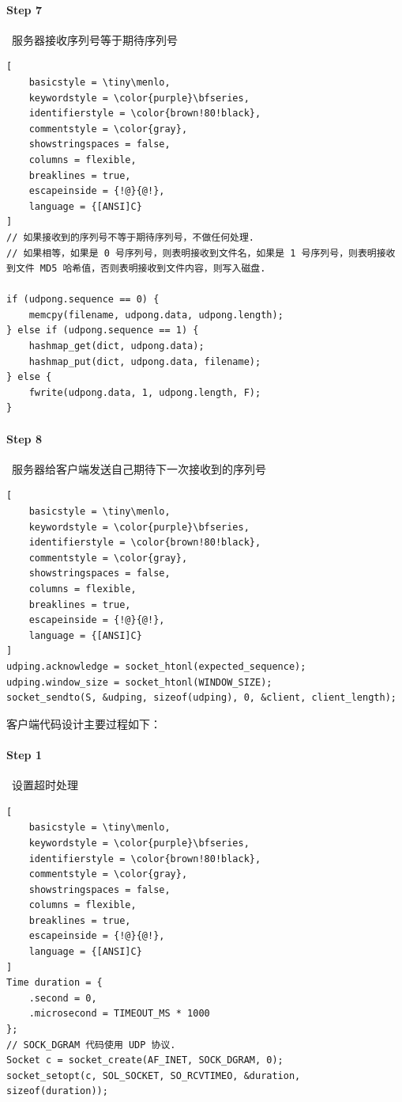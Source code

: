 \documentclass{article}
\begin{document}
\paragraph*{Step 7}~{服务器接收序列号等于期待序列号}
\begin{lstlisting}[
    basicstyle = \tiny\menlo,
    keywordstyle = \color{purple}\bfseries,
    identifierstyle = \color{brown!80!black},
    commentstyle = \color{gray},
    showstringspaces = false,
    columns = flexible,
    breaklines = true,
    escapeinside = {!@}{@!},
    language = {[ANSI]C}
]
// 如果接收到的序列号不等于期待序列号，不做任何处理.
// 如果相等，如果是 0 号序列号，则表明接收到文件名，如果是 1 号序列号，则表明接收到文件 MD5 哈希值，否则表明接收到文件内容，则写入磁盘.

if (udpong.sequence == 0) {
    memcpy(filename, udpong.data, udpong.length);
} else if (udpong.sequence == 1) {
    hashmap_get(dict, udpong.data);
    hashmap_put(dict, udpong.data, filename);
} else {
    fwrite(udpong.data, 1, udpong.length, F);
}
\end{lstlisting}

\paragraph*{Step 8}~{服务器给客户端发送自己期待下一次接收到的序列号}
\begin{lstlisting}[
    basicstyle = \tiny\menlo,
    keywordstyle = \color{purple}\bfseries,
    identifierstyle = \color{brown!80!black},
    commentstyle = \color{gray},
    showstringspaces = false,
    columns = flexible,
    breaklines = true,
    escapeinside = {!@}{@!},
    language = {[ANSI]C}
]
udping.acknowledge = socket_htonl(expected_sequence);
udping.window_size = socket_htonl(WINDOW_SIZE);
socket_sendto(S, &udping, sizeof(udping), 0, &client, client_length);
\end{lstlisting}

客户端代码设计主要过程如下：

\paragraph*{Step 1}~{设置超时处理}
\begin{lstlisting}[
    basicstyle = \tiny\menlo,
    keywordstyle = \color{purple}\bfseries,
    identifierstyle = \color{brown!80!black},
    commentstyle = \color{gray},
    showstringspaces = false,
    columns = flexible,
    breaklines = true,
    escapeinside = {!@}{@!},
    language = {[ANSI]C}
]
Time duration = {
    .second = 0,
    .microsecond = TIMEOUT_MS * 1000
};
// SOCK_DGRAM 代码使用 UDP 协议.
Socket c = socket_create(AF_INET, SOCK_DGRAM, 0);
socket_setopt(c, SOL_SOCKET, SO_RCVTIMEO, &duration, sizeof(duration));
\end{lstlisting}
\end{document}
